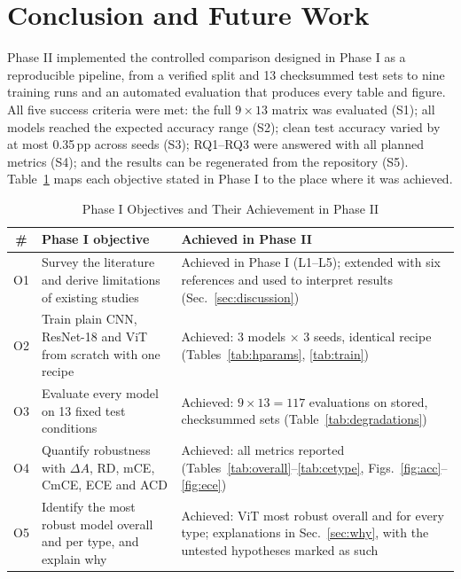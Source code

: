 \documentclass[conference]{IEEEtran}
\begin{document}
\section{Conclusion and Future Work}
Phase II implemented the controlled comparison designed in Phase I as a reproducible pipeline, from a verified split and 13 checksummed test sets to nine training runs and an automated evaluation that produces every table and figure. All five success criteria were met: the full $9 \times 13$ matrix was evaluated (S1); all models reached the expected accuracy range (S2); clean test accuracy varied by at most 0.35\,pp across seeds (S3); RQ1--RQ3 were answered with all planned metrics (S4); and the results can be regenerated from the repository (S5). Table~\ref{tab:objectives} maps each objective stated in Phase I to the place where it was achieved.

\begin{table}[!t]
\caption{Phase I Objectives and Their Achievement in Phase II}
\label{tab:objectives}
\centering
\scriptsize
\renewcommand{\arraystretch}{1.15}
\setlength{\tabcolsep}{3pt}
\begin{tabular}{@{}c >{\raggedright\arraybackslash}p{} >{\raggedright\arraybackslash}p{}@{}}
\toprule
\textbf{\#} & \textbf{Phase I objective} & \textbf{Achieved in Phase II} \\
\midrule
O1 & Survey the literature and derive limitations of existing studies & Achieved in Phase I (L1--L5); extended with six references and used to interpret results (Sec.~\ref{sec:discussion}) \\
O2 & Train plain CNN, ResNet-18 and ViT from scratch with one recipe & Achieved: 3 models $\times$ 3 seeds, identical recipe (Tables~\ref{tab:hparams}, \ref{tab:train}) \\
O3 & Evaluate every model on 13 fixed test conditions & Achieved: $9 \times 13 = 117$ evaluations on stored, checksummed sets (Table~\ref{tab:degradations}) \\
O4 & Quantify robustness with $\Delta A$, RD, mCE, CmCE, ECE and ACD & Achieved: all metrics reported (Tables~\ref{tab:overall}--\ref{tab:cetype}, Figs.~\ref{fig:acc}--\ref{fig:ece}) \\
O5 & Identify the most robust model overall and per type, and explain why & Achieved: ViT most robust overall and for every type; explanations in Sec.~\ref{sec:why}, with the untested hypotheses marked as such \\
\bottomrule
\end{tabular}
\end{table}
\end{document}
